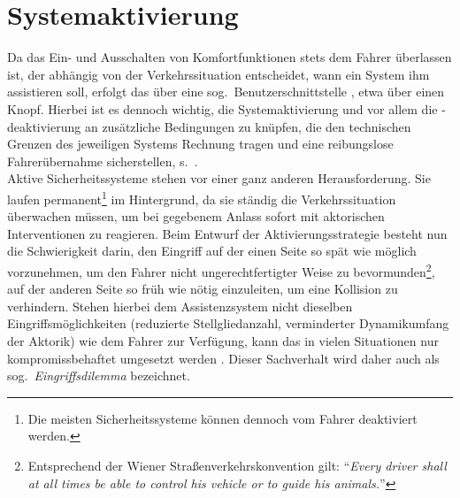
 

\section{Systemaktivierung} \label{sec:systemactivation}
Da das Ein- und Ausschalten von Komfortfunktionen stets dem Fahrer überlassen ist, der abhängig von der Verkehrssituation entscheidet, wann ein System ihm assistieren soll, erfolgt das über eine sog.\ Benutzerschnittstelle \cite{lindberg2012entwicklung}, etwa über einen Knopf. Hierbei ist es dennoch wichtig, die Systemaktivierung und vor allem die -deaktivierung an zusätzliche Bedingungen zu knüpfen, die den technischen Grenzen des jeweiligen Systems Rechnung tragen und eine reibungslose Fahrerübernahme sicherstellen, s.\ \zB \cite{Schaller2008}. \\
Aktive Sicherheitssysteme stehen vor einer ganz anderen Herausforderung. Sie laufen permanent\footnote{Die meisten Sicherheitssysteme können dennoch vom Fahrer deaktiviert werden.} im Hintergrund, da sie ständig die Verkehrssituation  überwachen müssen, um bei gegebenem Anlass sofort mit aktorischen Interventionen zu reagieren. Beim Entwurf der Aktivierungsstrategie besteht nun die Schwierigkeit darin, den Eingriff auf der einen Seite so spät wie möglich vorzunehmen, um den Fahrer nicht ungerechtfertigter Weise zu bevormunden\footnote{Entsprechend der Wiener Straßenverkehrskonvention \cite{UnitedNations1993} gilt: "`\emph{Every driver shall at all times be able to control his vehicle or to guide his animals.}"'}, auf der anderen Seite so früh wie nötig einzuleiten, um eine Kollision zu verhindern. Stehen hierbei dem Assistenzsystem nicht dieselben Eingriffsmöglichkeiten (reduzierte Stellgliedanzahl, verminderter Dynamikumfang der Aktorik) wie dem Fahrer zur Verfügung, kann das in vielen Situationen nur kompromissbehaftet umgesetzt werden \cite{reinisch2012diss,dang2012steering}. Dieser Sachverhalt wird daher auch als sog.\ \emph{Eingriffsdilemma} bezeichnet.

